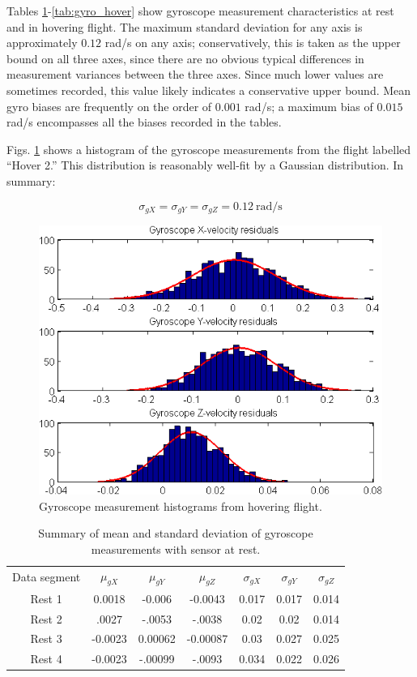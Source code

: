 \documentclass{article}
\begin{document}
Tables \ref{tab:gyro}-\ref{tab:gyro_hover} show gyroscope measurement characteristics at rest and in hovering flight. The maximum standard deviation for any axis is approximately $0.12$ rad/s on any axis; conservatively, this is taken as the upper bound on all three axes, since there are no obvious typical differences in measurement variances between the three axes. Since much lower values are sometimes recorded, this value likely indicates a conservative upper bound. Mean gyro biases are frequently on the order of $0.001$ rad/s; a maximum bias of $0.015$ rad/s encompasses all the biases recorded in the tables.

Figs. \ref{fig:hover_gyro_hist} shows a histogram of the gyroscope measurements from the flight labelled ``Hover 2.'' This distribution is reasonably well-fit by a Gaussian distribution. In summary:

\begin{equation}
\sigma_{gX} = \sigma_{gY} = \sigma_{gZ} = 0.12 \ \mathrm{rad/s}
\end{equation}

\begin{figure}[tb!]
\centering
\includegraphics[scale=1]{../hover_gyro_hist.png}
\caption{Gyroscope measurement histograms from hovering flight.}
\label{fig:hover_gyro_hist}
\end{figure}

\begin{table}[tb!]
\centering
\begin{tabular}{c|c|c|c|c|c|c}
Data segment & $\mu_{gX}$ & $\mu_{gY}$ & $\mu_{gZ}$ & $\sigma_{gX}$ & $\sigma_{gY}$ & $\sigma_{gZ}$\\
Rest 1 & 0.0018 & -0.006 & -0.0043 & 0.017 & 0.017 &  0.014\\
Rest 2 & .0027 & -.0053 & -.0038 & 0.02 & 0.02 & 0.014\\
Rest 3 & -0.0023 & 0.00062 & -0.00087 & 0.03 & 0.027 & 0.025\\
Rest 4 & -0.0023 & -.00099 & -.0093 & 0.034 & 0.022 & 0.026\\
\end{tabular}
\caption{Summary of mean and standard deviation of gyroscope measurements with sensor at rest.}
\label{tab:gyro}
\end{table}
\end{document}
